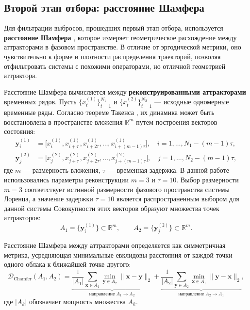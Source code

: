 \subsection*{Второй этап отбора: расстояние Шамфера}
Для фильтрации выбросов, прошедших первый этап отбора, используется \textbf{расстояние Шамфера}
 \cite{Wu2021}, которое измеряет геометрическое расхождение между аттракторами
  в фазовом пространстве. В отличие от эргодической метрики, оно чувствительно к форме и
   плотности распределения траекторий, позволяя отфильтровать системы с похожими
    операторами, но отличной геометрией аттрактора.

Расстояние Шамфера вычисляется между \textbf{реконструированными аттракторами} временных рядов.
 Пусть $\{x^{(1)}_t\}_{t=1}^{N_1}$ и $\{x^{(2)}_t\}_{t=1}^{N_2}$ — исходные одномерные временные ряды.
  Согласно теореме Такенса \cite{Takens1981}, их динамика может быть восстановлена в пространстве
   вложения $\mathbb{R}^m$ путем построения векторов состояния:
\begin{align}
\mathbf{y}^{(1)}_i &= \bigl[x^{(1)}_i, x^{(1)}_{i+\tau}, x^{(1)}_{i+2\tau}, \dots, x^{(1)}_{i+(m-1)\tau}\bigr], \quad i = 1, \dots, N_1-(m-1)\tau, \\
\mathbf{y}^{(2)}_j &= \bigl[x^{(2)}_j, x^{(2)}_{j+\tau}, x^{(2)}_{j+2\tau}, \dots, x^{(2)}_{j+(m-1)\tau}\bigr], \quad j = 1, \dots, N_2-(m-1)\tau,
\end{align}
где $m$ — размерность вложения, $\tau$ — временная задержка. В данной работе использовались
 параметры реконструкции $m=3$ и $\tau=10$. Выбор размерности $m=3$ соответствует истинной размерности фазового пространства системы Лоренца, а
 значение задержки $\tau=10$ является распространенным выбором для данной системы Совокупности этих векторов образуют
 множества точек аттракторов:
\begin{equation}
A_1 = \{\mathbf{y}^{(1)}_i\} \subset \mathbb{R}^m, \qquad A_2 = \{\mathbf{y}^{(2)}_j\} \subset \mathbb{R}^m.
\end{equation}

Расстояние Шамфера между аттракторами определяется как симметричная метрика, усредняющая 
минимальные евклидовы расстояния от каждой точки одного облака к ближайшей точке другого:
\begin{equation}
\mathcal{D}_{\text{Chamfer}}(A_1, A_2) = \underbrace{\frac{1}{|A_1|}\sum_{\mathbf{x}\in A_1}\min_{\mathbf{y}\in A_2}\|\mathbf{x}-\mathbf{y}\|_2}_{\text{направление } A_1 \to A_2} + \underbrace{\frac{1}{|A_2|}\sum_{\mathbf{y}\in A_2}\min_{\mathbf{x}\in A_1}\|\mathbf{y}-\mathbf{x}\|_2}_{\text{направление } A_2 \to A_1},
\end{equation}
где $|A_k|$ обозначает мощность множества $A_k$.

